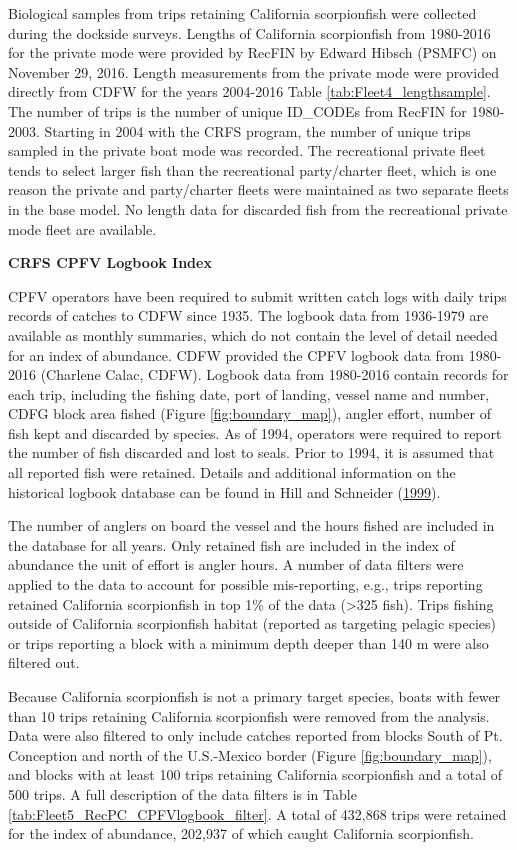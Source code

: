 \documentclass[12pt,]{article}
\begin{document}
Biological samples from trips retaining California scorpionfish were
collected during the dockside surveys. Lengths of California
scorpionfish from 1980-2016 for the private mode were provided by RecFIN
by Edward Hibsch (PSMFC) on November 29, 2016. Length measurements from
the private mode were provided directly from CDFW for the years
2004-2016 Table \ref{tab:Fleet4_lengthsample}. The number of trips is
the number of unique ID\_CODEs from RecFIN for 1980-2003. Starting in
2004 with the CRFS program, the number of unique trips sampled in the
private boat mode was recorded. The recreational private fleet tends to
select larger fish than the recreational party/charter fleet, which is
one reason the private and party/charter fleets were maintained as two
separate fleets in the base model. No length data for discarded fish
from the recreational private mode fleet are available.

\textbf{CRFS CPFV Logbook Index}

CPFV operators have been required to submit written catch logs with
daily trips records of catches to CDFW since 1935. The logbook data from
1936-1979 are available as monthly summaries, which do not contain the
level of detail needed for an index of abundance. CDFW provided the CPFV
logbook data from 1980-2016 (Charlene Calac, CDFW). Logbook data from
1980-2016 contain records for each trip, including the fishing date,
port of landing, vessel name and number, CDFG block area fished (Figure
\ref{fig:boundary_map}), angler effort, number of fish kept and
discarded by species. As of 1994, operators were required to report the
number of fish discarded and lost to seals. Prior to 1994, it is assumed
that all reported fish were retained. Details and additional information
on the historical logbook database can be found in Hill and Schneider
(\protect\hyperlink{ref-Hill1999}{1999}).

The number of anglers on board the vessel and the hours fished are
included in the database for all years. Only retained fish are included
in the index of abundance the unit of effort is angler hours. A number
of data filters were applied to the data to account for possible
mis-reporting, e.g., trips reporting retained California scorpionfish in
top 1\% of the data (\textgreater{}325 fish). Trips fishing outside of
California scorpionfish habitat (reported as targeting pelagic species)
or trips reporting a block with a minimum depth deeper than 140 m were
also filtered out.

Because California scorpionfish is not a primary target species, boats
with fewer than 10 trips retaining California scorpionfish were removed
from the analysis. Data were also filtered to only include catches
reported from blocks South of Pt. Conception and north of the
U.S.-Mexico border (Figure \ref{fig:boundary_map}), and blocks with at
least 100 trips retaining California scorpionfish and a total of 500
trips. A full description of the data filters is in Table
\ref{tab:Fleet5_RecPC_CPFVlogbook_filter}. A total of 432,868 trips were
retained for the index of abundance, 202,937 of which caught California
scorpionfish.
\end{document}
